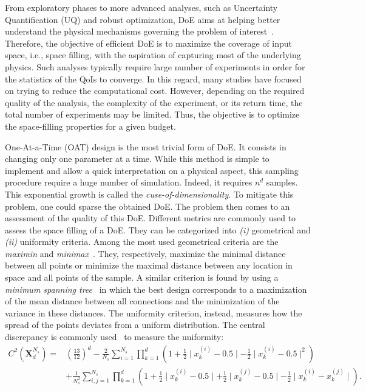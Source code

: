From exploratory phases to more advanced analyses, such as Uncertainty Quantification (UQ) and robust optimization, DoE aims at helping better understand the physical mechanisms governing the problem of interest~\citep{saltelli2007}. Therefore, the objective of efficient DoE is to maximize the coverage of input space, i.e., space filling, with the aspiration of capturing most of the underlying physics. Such analyses typically require large number of experiments in order for the statistics of the QoIs to converge. In this regard, many studies have focused on trying to reduce the computational cost. However, depending on the required quality of the analysis, the complexity of the experiment, or its return time, the total number of experiments may be limited. Thus, the objective is to optimize the space-filling properties for a given budget.

One-At-a-Time (OAT) design is the most trivial form of DoE. It consists in changing only one parameter at a time. While this method is simple to implement and allow a quick interpretation on a physical aspect, this sampling procedure require a huge number of simulation. Indeed, it requires $n^d$ samples. This exponential growth is called the \emph{cuse-of-dimensionality}. To mitigate this problem, one could sparse the obtained DoE. The problem then comes to an assessment of the quality of this DoE. Different metrics are commonly used to assess the space filling of a DoE. They can be categorized into \emph{(i)} geometrical and \emph{(ii)} uniformity criteria. Among the most used geometrical criteria are the \emph{maximin} and \emph{minimax}~\citep{Pronzato2017}. They, respectively, maximize the minimal distance between all points or minimize the maximal distance between any location in space and all points of the sample. A similar criterion is found by using a \emph{minimum spanning tree}~\citep{Franco2009} in which the best design corresponds to a maximization of the mean distance between all connections and the minimization of the variance in these distances. The uniformity criterion, instead, measures how the spread of the points deviates from a uniform distribution. The central discrepancy is commonly used~\citep{Fang2006,Damblin2013} to measure the uniformity:
\begin{align}
C^2(\mathbf{X}^{N_s}_d) =& \left( \frac{13}{12} \right)^d - \frac{2}{N_s}\displaystyle\sum_{i=1}^{N_s}\prod_{k=1}^{d} \left( 1 + \frac{1}{2} \mid  x_k^{(i)} - 0.5\mid - \frac{1}{2} \mid  x_k^{(i)} - 0.5\mid^2\right)\\ \nonumber
& + \frac{1}{N_s^2}\sum_{i,j=1}^{N_s}\prod_{k=1}^d \left( 1 + \frac{1}{2} \mid  x_k^{(i)} - 0.5\mid + \frac{1}{2} \mid  x_k^{(j)} - 0.5\mid - \frac{1}{2} \mid  x_k^{(i)} - x_k^{(j)}\mid \right). \label{eq:c2}
\end{align}

